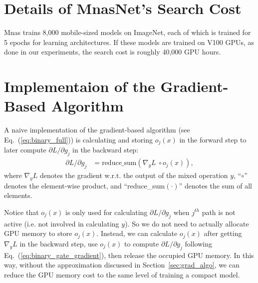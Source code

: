 \documentclass{article} \usepackage{iclr2019_conference,times}
\begin{document}
\section{Details of MnasNet's Search Cost}\label{sec:mnas_cost}
Mnas \citep{tan2018mnasnet} trains 8,000 mobile-sized models on ImageNet, each of which is trained for 5 epochs for learning architectures. If these models are trained on V100 GPUs, as done in our experiments, the search cost is roughly 40,000 GPU hours. 

\section{Implementaion of the Gradient-Based Algorithm}\label{sec:grad_discussion}
A naive implementation of the gradient-based algorithm (see Eq.~(\ref{eq:binary_full})) is calculating and storing $o_j(x)$ in the forward step to later compute $\partial L / \partial g_j$ in the backward step:
\begin{align}\label{eq:binary_gate_gradient}
    \partial L / \partial g_j &= \text{reduce\_sum} (\nabla_y L~\circ o_j(x)),
\end{align}
where $\nabla_y L$ denotes the gradient w.r.t. the output of the mixed operation $y$, ``$\circ$'' denotes the element-wise product, and ``reduce\_sum$(\cdot)$'' denotes the sum of all elements.

Notice that $o_j(x)$ is only used for calculating $\partial L / \partial g_j$ when $j^{th}$ path is not active (i.e. not involved in calculating $y$). So we do not need to actually allocate GPU memory to store $o_j(x)$. Instead, we can calculate $o_j(x)$ after getting $\nabla_y L$ in the backward step, use $o_j(x)$ to compute $\partial L / \partial g_j$ following Eq.~(\ref{eq:binary_gate_gradient}), then release the occupied GPU memory. 
In this way, without the approximation discussed in Section~\ref{sec:grad_algo}, we can reduce the GPU memory cost to the same level of training a compact model. 
\end{document}
